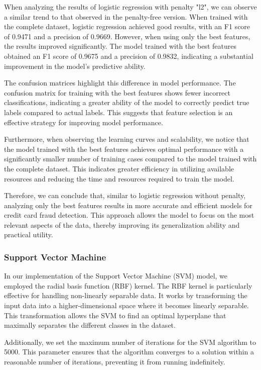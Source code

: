 \documentclass[conference]{IEEEtran}
\begin{document}
When analyzing the results of logistic regression with penalty "l2", we can observe a similar trend to that observed in the penalty-free version. When trained with the complete dataset, logistic regression achieved good results, with an F1 score of 0.9471 and a precision of 0.9669. However, when using only the best features, the results improved significantly. The model trained with the best features obtained an F1 score of 0.9675 and a precision of 0.9832, indicating a substantial improvement in the model's predictive ability.

The confusion matrices highlight this difference in model performance. The confusion matrix for training with the best features shows fewer incorrect classifications, indicating a greater ability of the model to correctly predict true labels compared to actual labels. This suggests that feature selection is an effective strategy for improving model performance.

Furthermore, when observing the learning curves and scalability, we notice that the model trained with the best features achieves optimal performance with a significantly smaller number of training cases compared to the model trained with the complete dataset. This indicates greater efficiency in utilizing available resources and reducing the time and resources required to train the model.

Therefore, we can conclude that, similar to logistic regression without penalty, analyzing only the best features results in more accurate and efficient models for credit card fraud detection. This approach allows the model to focus on the most relevant aspects of the data, thereby improving its generalization ability and practical utility.

\subsubsection{Support Vector Machine}

In our implementation of the Support Vector Machine (SVM) model, we employed the radial basis function (RBF) kernel. The RBF kernel is particularly effective for handling non-linearly separable data. It works by transforming the input data into a higher-dimensional space where it becomes linearly separable. This transformation allows the SVM to find an optimal hyperplane that maximally separates the different classes in the dataset.

Additionally, we set the maximum number of iterations for the SVM algorithm to 5000. This parameter ensures that the algorithm converges to a solution within a reasonable number of iterations, preventing it from running indefinitely.
\end{document}
